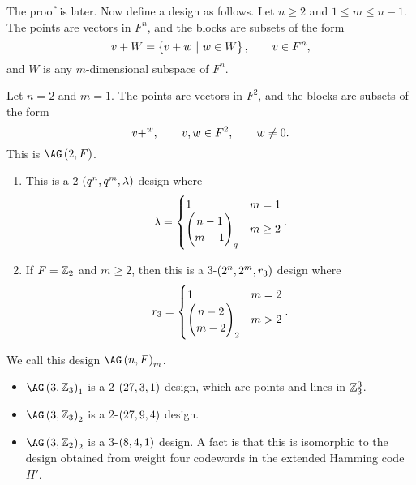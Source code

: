 The proof is later. Now define a design as follows. Let $ n \ge 2 $ and $ 1 \le m \le n - 1 $. The points are vectors in $ F^n $, and the blocks are subsets of the form
$$ v + W = \cbr{v + w \st w \in W}, \qquad v \in F^n, $$
and $ W $ is any $ m $-dimensional subspace of $ F^n $.

\begin{example*}
Let $ n = 2 $ and $ m = 1 $. The points are vectors in $ F^2 $, and the blocks are subsets of the form
$$ v + \sp w, \qquad v, w \in F^2, \qquad w \ne 0. $$
This is $ \AG\br{2, F} $.
\end{example*}

\begin{proposition}
\label{prop:3.17}
\hfill
\begin{enumerate}
\item This is a $ 2 $-$ \br{q^n, q^m, \lambda} $ design where
$$ \lambda =
\begin{cases}
1 & m = 1 \\
\begin{pmatrix} n - 1 \\ m - 1 \end{pmatrix}_q & m \ge 2
\end{cases}.
$$
\item If $ F = \mathbb{Z}_2 $ and $ m \ge 2 $, then this is a $ 3 $-$ \br{2^n, 2^m, r_3} $ design where
$$ r_3 =
\begin{cases}
1 & m = 2 \\
\begin{pmatrix} n - 2 \\ m - 2 \end{pmatrix}_2 & m > 2
\end{cases}.
$$
\end{enumerate}
\end{proposition}

We call this design $ \AG\br{n, F}_m $.

\pagebreak

\begin{example*}
\hfill
\begin{itemize}
\item $ \AG\br{3, \ZZ_3}_1 $ is a $ 2 $-$ \br{27, 3, 1} $ design, which are points and lines in $ \mathbb{Z}_3^3 $.
\item $ \AG\br{3, \ZZ_3}_2 $ is a $ 2 $-$ \br{27, 9, 4} $ design.
\item $ \AG\br{3, \ZZ_2}_2 $ is a $ 3 $-$ \br{8, 4, 1} $ design. A fact is that this is isomorphic to the design obtained from weight four codewords in the extended Hamming code $ H' $.
\end{itemize}
\end{example*}

